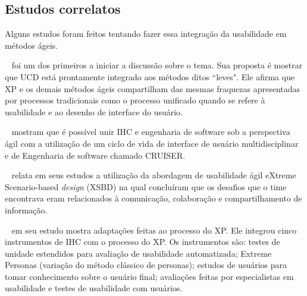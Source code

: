 \subsection{Estudos correlatos}

Alguns estudos foram feitos tentando fazer essa integração da usabilidade em métodos ágeis. 

~ foi um dos primeiros a iniciar a discussão sobre o tema. Sua proposta é mostrar que UCD está prontamente integrado aos métodos ditos ``leves". Ele afirma que XP e os demais métodos ágeis compartilham das mesmas fraquezas apresentadas por processos tradicionais como o processo unificado quando se refere à usabilidade e ao desenho de interface do usuário.


~ mostram que é possível unir IHC e engenharia de software sob a perspectiva ágil com a utilização de um ciclo de vida de interface de usuário multidisciplinar e de Engenharia de software chamado CRUISER.



~ relata em seus estudos a utilização da abordagem de usabilidade ágil eXtreme Scenario-based \emph{design} (XSBD) na qual concluíram que os desafios que o time encontrava eram relacionados à comunicação, colaboração e compartilhamento de informação.

~ em seu estudo mostra adaptações feitas ao processo do XP. Ele integrou cinco instrumentos de IHC com o processo do XP. Os instrumentos são: testes de unidade estendidos para avaliação de usabilidade automatizada; Extreme Personas (variação do método clássico de personas); estudos de usuários para tomar conhecimento sobre o usuário final; avaliações feitas por especialistas em usabilidade e testes de usabilidade com usuários.
 
